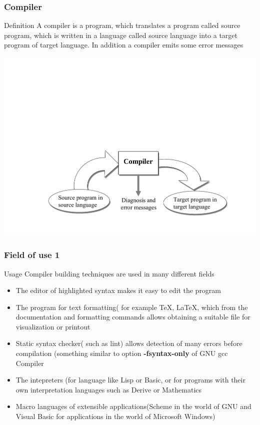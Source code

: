 \documentclass{beamer}
\begin{document}
\begin{frame}
\frametitle{Compiler}
\begin{block}{Definition}
A compiler is a program, which translates a program called source program, which is written in a language called source language into a target program of target language. In addition a compiler emits some error messages
\end{block}
\begin{center}
\includegraphics[scale=0.5]{2}
\end{center}
\end{frame}


\begin{frame}
\frametitle{Field of use 1}
\begin{block}{Usage}
Compiler building techniques are used in many different fields
\end{block}
\begin{itemize}
\item The editor of highlighted syntax makes it easy to edit the program
\item The program for text formatting( for example TeX, LaTeX, which from the documentation and formatting commands allows obtaining a suitable file for visualization or printout 
\item Static syntax checker( such as lint) allows detection of many errors before compilation (something similar to option \textbf{-fsyntax-only} of GNU gcc Compiler
\item The intepreters (for language like Lisp or Basic, or for programs with their own interpretation languages such as Derive or Mathematics
\item Macro languages of extensible applications(Scheme in the world of GNU and Visual Basic for applications in the world of Microsoft Windows)
\end{itemize}
\end{frame}
\end{document}
